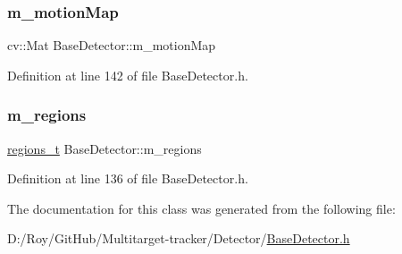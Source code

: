 \mbox{\label{class_base_detector_a45a2d54a0b69e271aa5c44ee301682b7}} 
\subsubsection{\texorpdfstring{m\+\_\+motion\+Map}{m\_motionMap}}
{\footnotesize\ttfamily cv\+::\+Mat Base\+Detector\+::m\+\_\+motion\+Map\hspace{0.3cm}{\ttfamily [protected]}}



Definition at line 142 of file Base\+Detector.\+h.

\mbox{\label{class_base_detector_a409c20093acba261db8354ca72058fce}} 
\subsubsection{\texorpdfstring{m\+\_\+regions}{m\_regions}}
{\footnotesize\ttfamily \mbox{\hyperlink{defines_8h_a01db0de56a20f4342820a093c5154536}{regions\+\_\+t}} Base\+Detector\+::m\+\_\+regions\hspace{0.3cm}{\ttfamily [protected]}}



Definition at line 136 of file Base\+Detector.\+h.



The documentation for this class was generated from the following file\+:\begin{DoxyCompactItemize}
\item 
D\+:/\+Roy/\+Git\+Hub/\+Multitarget-\/tracker/\+Detector/\mbox{\hyperlink{_base_detector_8h}{Base\+Detector.\+h}}\end{DoxyCompactItemize}
